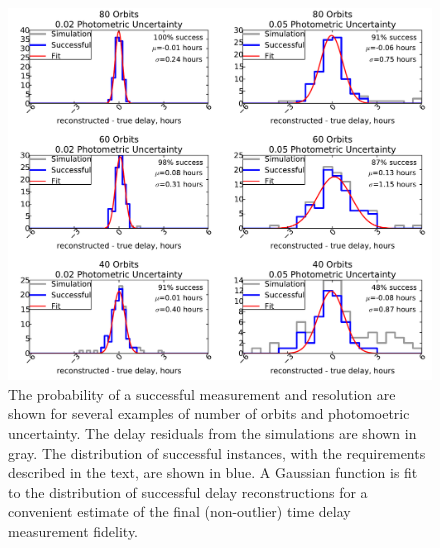 \documentclass{emulateapj}
\begin{document}
\begin{figure}[t]
\begin{center}
\includegraphics[width=\linewidth]{./systematic_examples.pdf}
\caption{The probability of a successful measurement and resolution
  are shown for several examples of number of orbits and photomoetric
  uncertainty. The delay residuals from the simulations are shown in
  gray. The distribution of successful instances, with the
  requirements described in the text, are shown in blue. A Gaussian
  function is fit to the distribution of successful delay
  reconstructions for a convenient estimate of the final (non-outlier)
  time delay measurement fidelity.}\label{fig:example}
\end{center}
\end{figure}
\end{document}
